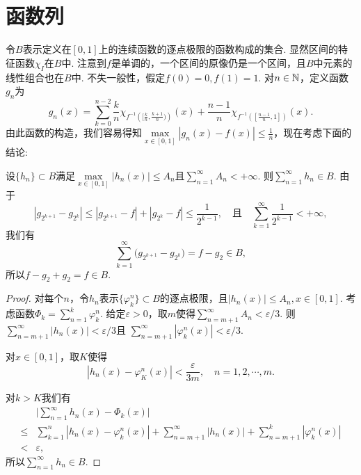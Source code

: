 \section{函数列}
\begin{ans}
  令$B$表示定义在$[0,1]$上的连续函数的逐点极限的函数构成的集合. 显然区间的特征函数$\chi_I$在$B$中. 注意到$f$是单调的，一个区间的原像仍是一个区间，且$B$中元素的线性组合也在$B$中. 不失一般性，假定$f(0)=0,f(1)=1$. 对$n\in\mathbb N$，定义函数$g_n$为
  \[
    g_n(x) = \sum_{k=0}^{n-2}\frac kn\chi_
    {f^{-1}\left([\frac kn,\frac{k+1}n)\right)}(x)
    + \frac{n-1}n\chi_{f^{-1}
    \left([\frac{n-1}n,1]\right)}(x).
  \]
  由此函数的构造，我们容易得知$\max\limits_{x\in[0,1]}|g_n(x)-f(x)|\le\frac1n$，现在考虑下面的结论:
  \begin{lemma}
    设$\{h_n\}\subset B$满足$\max\limits_{x\in[0,1]}|h_n(x)|
    \le A_n$且$\sum_{n=1}^\infty A_n<+\infty$. 则$\sum_{n=1}^\infty h_n\in B$. 由于
    \[
     |g_{2^{k+1}}-g_{2^k}| \le |g_{2^{k+1}}-f|+
     |g_{2^k}-f| \le \frac1{2^{k-1}},\quad \text{且}\quad
     \sum_{k=1}^\infty \frac1{2^{k-1}}<+\infty,
    \]
    我们有
    \[ \sum_{k=1}^\infty\big(g_{2^{k+1}}-g_{2^k}\big)=
    f-g_2\in B, \]
    所以$f-g_2+g_2=f\in B$.
  \end{lemma}
  \begin{proof}
    对每个$n$，令$h_n$表示$\{\varphi_k^n\}\subset B$的逐点极限，且$|h_n(x)|\le A_n,x\in[0,1]$. 考虑函数$\varPhi_k=\sum_{n=1}^k\varphi_k^n$. 给定$\varepsilon>0$，取$m$使得$\sum_{n=m+1}^\infty A_n<\varepsilon/3$. 则$\sum_{n=m+1}^\infty|h_n(x)|<\varepsilon/3$且
    $\sum_{n=m+1}^\infty|\varphi_k^n(x)|<\varepsilon/3$.

    对$x\in[0,1]$，取$K$使得
    \[
      |h_n(x)-\varphi_K^n(x)|<\frac\varepsilon{3m},\quad n=1,2,\cdots,m.
    \]

    对$k>K$我们有
    \begin{align*}
      & \bigg| \sum_{n=1}^\infty h_n(x) -\varPhi_k(x) \bigg|\\
      \le {} & \sum_{k=1}^n|h_n(x)-\varphi_k^n(x)| +
      \sum_{n=m+1}^\infty|h_n(x)| + \sum_{n=m+1}^k
      |\varphi_k^n(x)|\\
      < {} & \varepsilon,
    \end{align*}
    所以$\sum_{n=1}^\infty h_n\in B$.
  \end{proof}
\end{ans}

